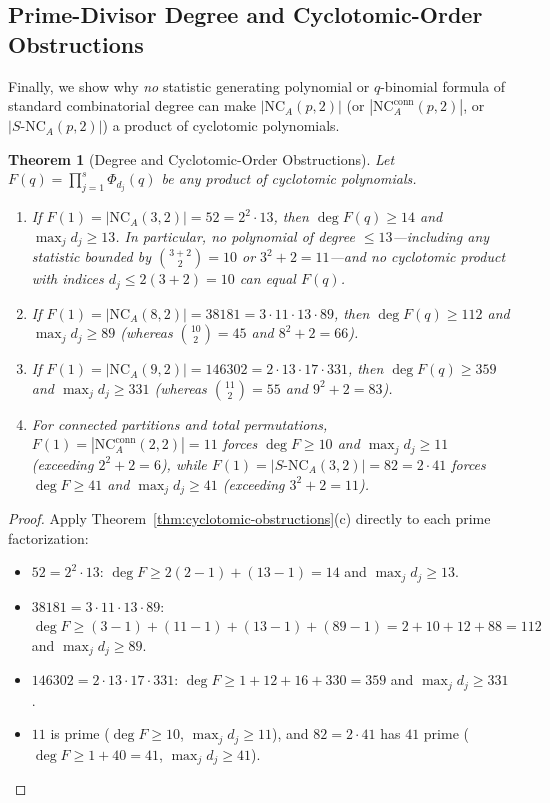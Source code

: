 \documentclass[11pt,a4paper]{article}
\newtheorem{theorem}{Theorem}[section]
\theoremstyle{definition}
\theoremstyle{remark}
\newcommand{\NCA}{\mathrm{NC}_A}
\newcommand{\SNCA}{S\text{-}\mathrm{NC}_A}
\begin{document}
\subsection{Prime-Divisor Degree and Cyclotomic-Order Obstructions}

Finally, we show why \emph{no} statistic generating polynomial or $q$-binomial formula of standard combinatorial degree can make $|\NCA(p,2)|$ (or $|\NCA^{\mathrm{conn}}(p,2)|$, or $|\SNCA(p,2)|$) a product of cyclotomic polynomials.

\begin{theorem}[Degree and Cyclotomic-Order Obstructions]\label{thm:degree-obstruction}
Let $F(q) = \prod_{j=1}^s \Phi_{d_j}(q)$ be any product of cyclotomic polynomials.
\begin{enumerate}
  \item[(a)] If $F(1) = |\NCA(3,2)| = 52 = 2^2 \cdot 13$, then $\deg F(q) \ge 14$ and $\max_j d_j \ge 13$. In particular, no polynomial of degree $\le 13$---including any statistic bounded by $\binom{3+2}{2} = 10$ or $3^2 + 2 = 11$---and no cyclotomic product with indices $d_j \le 2(3+2) = 10$ can equal $F(q)$.
  \item[(b)] If $F(1) = |\NCA(8,2)| = 38181 = 3 \cdot 11 \cdot 13 \cdot 89$, then $\deg F(q) \ge 112$ and $\max_j d_j \ge 89$ (whereas $\binom{10}{2} = 45$ and $8^2 + 2 = 66$).
  \item[(c)] If $F(1) = |\NCA(9,2)| = 146302 = 2 \cdot 13 \cdot 17 \cdot 331$, then $\deg F(q) \ge 359$ and $\max_j d_j \ge 331$ (whereas $\binom{11}{2} = 55$ and $9^2 + 2 = 83$).
  \item[(d)] For connected partitions and total permutations, $F(1) = |\NCA^{\mathrm{conn}}(2,2)| = 11$ forces $\deg F \ge 10$ and $\max_j d_j \ge 11$ (exceeding $2^2 + 2 = 6$), while $F(1) = |\SNCA(3,2)| = 82 = 2 \cdot 41$ forces $\deg F \ge 41$ and $\max_j d_j \ge 41$ (exceeding $3^2 + 2 = 11$).
\end{enumerate}
\end{theorem}

\begin{proof}
Apply Theorem~\ref{thm:cyclotomic-obstructions}(c) directly to each prime factorization:
\begin{itemize}
  \item $52 = 2^2 \cdot 13$: $\deg F \ge 2(2-1) + (13-1) = 14$ and $\max_j d_j \ge 13$.
  \item $38181 = 3 \cdot 11 \cdot 13 \cdot 89$: $\deg F \ge (3-1) + (11-1) + (13-1) + (89-1) = 2 + 10 + 12 + 88 = 112$ and $\max_j d_j \ge 89$.
  \item $146302 = 2 \cdot 13 \cdot 17 \cdot 331$: $\deg F \ge 1 + 12 + 16 + 330 = 359$ and $\max_j d_j \ge 331$.
  \item $11$ is prime ($\deg F \ge 10$, $\max_j d_j \ge 11$), and $82 = 2 \cdot 41$ has $41$ prime ($\deg F \ge 1 + 40 = 41$, $\max_j d_j \ge 41$). \qedhere
\end{itemize}
\end{proof}
\end{document}
